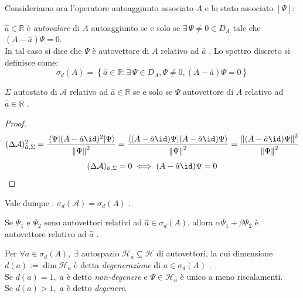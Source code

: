 Consideriamo ora l'operatore autoaggiunto associato \(A\) e lo stato associato \([\Psi]\):
\begin{definition}
    \(\hat{a} \in \mathbb{R}\) è \textit{autovalore} di \(A\) autoaggiunto se e solo se \(\exists \,\Psi \neq 0 \in D_A\) tale che \((A-\hat{a})\Psi=0\). \\
    In tal caso si dice che \(\Psi\) è autovettore di \(A\) relativo ad \(\hat{a}\) .
    Lo spettro discreto si definisce come:
    \[
        \sigma_d(A)  = \left\{ \hat{a} \in \mathbb{R} : \exists\, \Psi \in D_A, \Psi \neq 0 , (A-\hat{a})\Psi =0\right\}
    \]
\end{definition}

\begin{theorem}
    \(\Sigma\) autostato di \(\mathcal{A}\) relativo ad \(\hat{a} \in \mathbb{R}\) se e solo se \(\Psi\) autovettore di \(A\) relativo ad \(\hat{a} \in \mathbb{R}\) .
\end{theorem}
\begin{proof}
    \[
        (\Delta \mathcal{A})^2_{\hat{a},\Sigma}= \frac{\expval{(A-\hat{a}\id)^2}{\Psi}}{\norm{\Psi}^2}= 
        \frac{\braket{(A-\hat{a}\id)\Psi}{(A-\hat{a}\id)\Psi}}{\norm{\Psi}^2} = \frac{\norm{(A-\hat{a}\id)\Psi}^2}{\norm{\Psi}^2}
    \]
    \[
        (\Delta\mathcal{A})_{\hat{a},\Sigma} = 0 \iff (A-\hat{a}\id)\Psi=0 
    \]    
\end{proof}

\begin{remark}
    Vale dunque : \(\sigma_d(\mathcal{A})= \sigma_d(A)\) .
\end{remark}

\begin{remark}
    Se \(\Psi_1\) e \(\Psi_2\) sono autovettori relativi ad \(\hat{a} \in \sigma_d(A)\), allora \(\alpha\Psi_1+ \beta\Psi_2\) è autovettore relativo ad \(\hat{a}\) .
\end{remark}
\begin{definition}
    Per \(\forall a \in \sigma_d(A) , \; \exists\) autospazio \(\mathcal{H}_a\subseteq\mathcal{H}\) di autovettori, 
    la cui dimensione \(d(a):= \operatorname{dim}\mathcal{H}_a\) è detta \textit{degenerazione} di \(a \in \sigma_d(A)\) .\\
    Se \(d(a)=1,\; a \) è detto \textit{non-degenere} e \(\Psi\in \mathcal{H}_a\) è unico a meno riscalamenti. \\Se \(d(a)>1, \; a\) è detto \textit{degenere}.
\end{definition}

